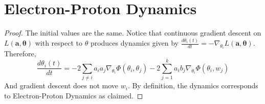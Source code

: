 \section{Electron-Proton Dynamics}

\epdyn*

\begin{proof}
The initial values are the same. Notice that continuous gradient descent on $L(\boldsymbol{a,\theta})$ with respect to $\theta$ produces dynamics given by $\frac{d\theta_i(t)}{dt} = -\nabla_{\theta_i}L(\boldsymbol{a,\theta})$. Therefore,
\[\frac{d\theta_i(t)}{dt} = -2\sum_{j \neq i} a_i a_j
\nabla_{\theta_i}\Phi(\theta_i,\theta_j) - 2\sum_{j=1}^k
a_ib_j\nabla_{\theta_i} \Phi(\theta_i,w_j)\] 
And gradient descent does not move $w_i$. By definition, the dynamics corresponds to Electron-Proton Dynamics as claimed.
\end{proof}
